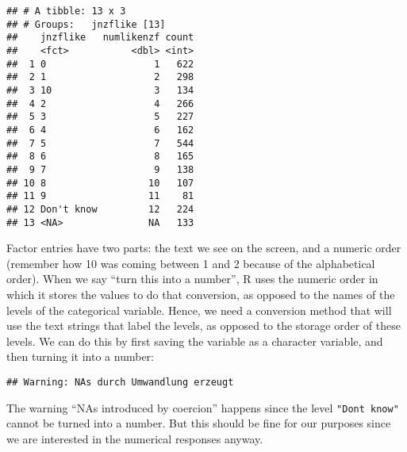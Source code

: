 \documentclass[]{article}
\newenvironment{Shaded}{\begin{snugshade}}{\end{snugshade}}
\newcommand{\KeywordTok}[1]{\textcolor[rgb]{0.13,0.29,0.53}{\textbf{#1}}}
\newcommand{\DataTypeTok}[1]{\textcolor[rgb]{0.13,0.29,0.53}{#1}}
\newcommand{\StringTok}[1]{\textcolor[rgb]{0.31,0.60,0.02}{#1}}
\newcommand{\OperatorTok}[1]{\textcolor[rgb]{0.81,0.36,0.00}{\textbf{#1}}}
\newcommand{\NormalTok}[1]{#1}
\begin{document}
\begin{verbatim}
## # A tibble: 13 x 3
## # Groups:   jnzflike [13]
##    jnzflike   numlikenzf count
##    <fct>           <dbl> <int>
##  1 0                   1   622
##  2 1                   2   298
##  3 10                  3   134
##  4 2                   4   266
##  5 3                   5   227
##  6 4                   6   162
##  7 5                   7   544
##  8 6                   8   165
##  9 7                   9   138
## 10 8                  10   107
## 11 9                  11    81
## 12 Don't know         12   224
## 13 <NA>               NA   133
\end{verbatim}

Factor entries have two parts: the text we see on the screen, and a
numeric order (remember how 10 was coming between 1 and 2 because of the
alphabetical order). When we say ``turn this into a number'', R uses the
numeric order in which it stores the values to do that conversion, as
opposed to the names of the levels of the categorical variable. Hence,
we need a conversion method that will use the text strings that label
the levels, as opposed to the storage order of these levels. We can do
this by first saving the variable as a character variable, and then
turning it into a number:

\begin{Shaded}
\end{Shaded}

\begin{verbatim}
## Warning: NAs durch Umwandlung erzeugt
\end{verbatim}

The warning ``NAs introduced by coercion'' happens since the level
\texttt{"Don\textquotesingle{}t\ know"} cannot be turned into a number.
But this should be fine for our purposes since we are interested in the
numerical responses anyway.

\begin{Shaded}
\end{Shaded}
\end{document}
